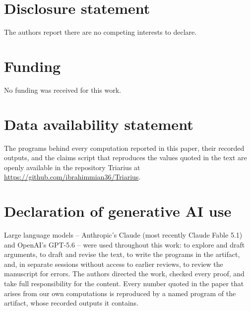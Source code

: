 \documentclass[11pt]{article}
\theoremstyle{plain}
\theoremstyle{definition}
\begin{document}
\section*{Disclosure statement}
The authors report there are no competing interests to declare.

\section*{Funding}
No funding was received for this work.

\section*{Data availability statement}
The programs behind every computation reported in this paper,
their recorded outputs, and the claims script that reproduces the
values quoted in the text are openly available in the repository
Triarius at \url{https://github.com/ibrahimmian36/Triarius}.

\section*{Declaration of generative AI use}
Large language models -- Anthropic's Claude (most recently Claude
Fable 5.1) and OpenAI's GPT-5.6 -- were used throughout this work:
to explore and draft arguments, to draft and revise the text, to
write the programs in the artifact, and, in separate sessions
without access to earlier reviews, to review the manuscript for
errors.  The authors directed the work, checked every proof, and
take full responsibility for the content.  Every number quoted in
the paper that arises from our own computations is reproduced by
a named program of the artifact, whose recorded outputs it
contains.
\end{document}
